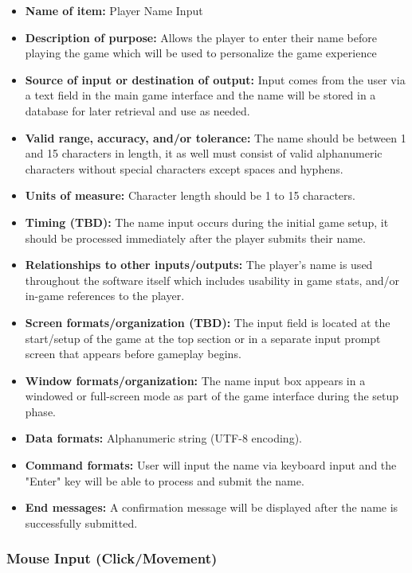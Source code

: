 \documentclass{article}
\begin{document}
\begin{itemize}
    \item \textbf{Name of item:} Player Name Input
    \item \textbf{Description of purpose:} Allows the player to enter their name before playing the game which will be used to personalize the game experience 
    \item \textbf{Source of input or destination of output:} Input comes from the user via a text field in the main game interface and the name will be stored in a database for later retrieval and use as needed.
    \item \textbf{Valid range, accuracy, and/or tolerance:} The name should be between 1 and 15 characters in length, it as well must consist of valid alphanumeric characters without special characters except spaces and hyphens.
    \item \textbf{Units of measure:} Character length should be 1 to 15 characters.
    \item \textbf{Timing (TBD):} The name input occurs during the initial game setup, it should be processed immediately after the player submits their name.
    \item \textbf{Relationships to other inputs/outputs:} The player’s name is used throughout the software itself which includes usability in game stats, and/or in-game references to the player.
    \item \textbf{Screen formats/organization (TBD):} The input field is located at the start/setup of the game at the top section or in a separate input prompt screen that appears before gameplay begins.
    \item \textbf{Window formats/organization:} The name input box appears in a windowed or full-screen mode as part of the game interface during the setup phase.
    \item \textbf{Data formats:} Alphanumeric string (UTF-8 encoding).
    \item \textbf{Command formats:} User will input the name via keyboard input and the "Enter" key will be able to process and submit the name.
    \item \textbf{End messages:} A confirmation message will be displayed after the name is successfully submitted.
\end{itemize}

\subsubsection{Mouse Input (Click/Movement)}
\end{document}
